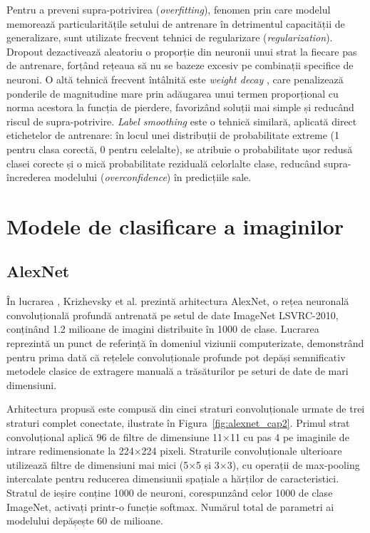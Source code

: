 Pentru a preveni supra-potrivirea (\textit{overfitting}), fenomen prin care modelul memorează particularitățile setului de antrenare în detrimentul capacității de generalizare, sunt utilizate frecvent tehnici de regularizare (\textit{regularization}). Dropout \cite{srivastava2014dropout} dezactivează aleatoriu o proporție din neuronii unui strat la fiecare pas de antrenare, forțând rețeaua să nu se bazeze excesiv pe combinații specifice de neuroni. O altă tehnică frecvent întâlnită este \textit{weight decay} \cite{krogh1991weightdecay}, care penalizează ponderile de magnitudine mare prin adăugarea unui termen proporțional cu norma acestora la funcția de pierdere, favorizând soluții mai simple și reducând riscul de supra-potrivire.  \textit{Label smoothing} \cite{szegedy2016labelsmoothing} este o tehnică similară, aplicată direct etichetelor de antrenare: în locul unei distribuții de probabilitate extreme (1 pentru clasa corectă, 0 pentru celelalte), se atribuie o probabilitate ușor redusă clasei corecte și o mică probabilitate reziduală celorlalte clase, reducând supra-încrederea modelului (\textit{overconfidence}) în predicțiile sale.



\section{Modele de clasificare a imaginilor}

\subsection{AlexNet}

În lucrarea \cite{krizhevsky2012imagenet}, Krizhevsky et al. prezintă arhitectura AlexNet, o rețea neuronală convoluțională profundă antrenată pe setul de date ImageNet LSVRC-2010, conținând 1.2 milioane de imagini distribuite în 1000 de clase. Lucrarea reprezintă un punct de referință în domeniul viziunii computerizate, demonstrând pentru prima dată că rețelele convoluționale profunde pot depăși semnificativ metodele clasice de extragere manuală a trăsăturilor pe seturi de date de mari dimensiuni.

Arhitectura propusă este compusă din cinci straturi convoluționale urmate de trei straturi complet conectate, ilustrate în Figura~\ref{fig:alexnet_cap2}. Primul strat convoluțional aplică 96 de filtre de dimensiune 11×11 cu pas 4 pe imaginile de intrare redimensionate la 224×224 pixeli. Straturile convoluționale ulterioare utilizează filtre de dimensiuni mai mici (5×5 și 3×3), cu operații de max-pooling intercalate pentru reducerea dimensiunii spațiale a hărților de caracteristici. Stratul de ieșire conține 1000 de neuroni, corespunzând celor 1000 de clase ImageNet, activați printr-o funcție softmax. Numărul total de parametri ai modelului depășește 60 de milioane.

